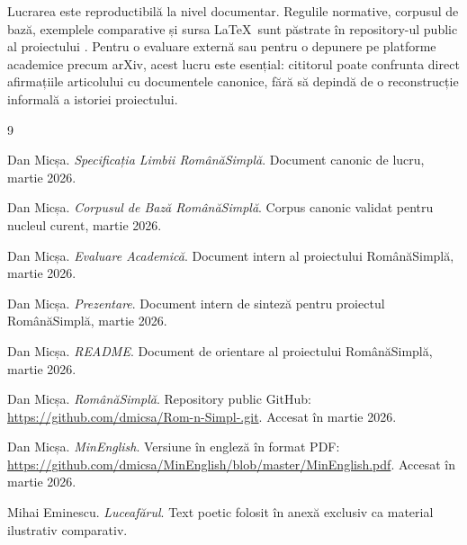 \documentclass[12pt,onecolumn,letterpaper]{article}
\begin{document}
Lucrarea este reproductibilă la nivel documentar. Regulile normative, corpusul
de bază, exemplele comparative și sursa \LaTeX\ sunt păstrate în repository-ul
public al proiectului \cite{rs-repo}. Pentru o evaluare externă sau pentru o
depunere pe platforme academice precum arXiv, acest lucru este esențial: cititorul
poate confrunta direct afirmațiile articolului cu documentele canonice, fără să
depindă de o reconstrucție informală a istoriei proiectului.

\begin{thebibliography}{9}

Dan Micșa.
\textit{Specificația Limbii RomânăSimplă}.
Document canonic de lucru, martie 2026.

Dan Micșa.
\textit{Corpusul de Bază RomânăSimplă}.
Corpus canonic validat pentru nucleul curent, martie 2026.

Dan Micșa.
\textit{Evaluare Academică}.
Document intern al proiectului RomânăSimplă, martie 2026.

Dan Micșa.
\textit{Prezentare}.
Document intern de sinteză pentru proiectul RomânăSimplă, martie 2026.

Dan Micșa.
\textit{README}.
Document de orientare al proiectului RomânăSimplă, martie 2026.

Dan Micșa.
\textit{RomânăSimplă}.
Repository public GitHub: \url{https://github.com/dmicsa/Rom-n-Simpl-.git}.
Accesat în martie 2026.

Dan Micșa.
\textit{MinEnglish}.
Versiune în engleză în format PDF: \url{https://github.com/dmicsa/MinEnglish/blob/master/MinEnglish.pdf}.
Accesat în martie 2026.

Mihai Eminescu.
\textit{Luceafărul}.
Text poetic folosit în anexă exclusiv ca material ilustrativ comparativ.

\end{thebibliography}
\end{document}
